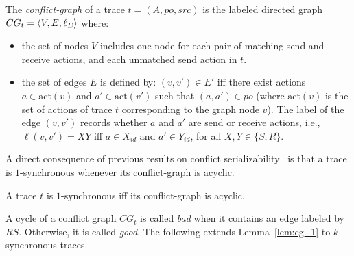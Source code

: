 
\begin{definition}\label{def:conf_graph}
    The \emph{conflict-graph} of a trace $t=(A,po,src)$ is the labeled directed graph $CG_t=\left\langle {V,E,\ell_E} \right\rangle$ where:
\begin{itemize}
	\item the set of nodes $V$ includes one node for each pair of matching send and receive actions, and each unmatched send action in $t$. 
    	\item the set of edges $E$ is defined by: $(v,v') \in E'$ iff there exist actions $a \in \mathrm{act}(v)$ and $a' \in \mathrm{act}(v')$ such that $(a,a') \in po$ (where $\mathrm{act}(v)$ is the set of actions of trace $t$ corresponding to the graph node $v$). The label of the edge $(v,v')$ records whether $a$ and $a'$ are send or receive actions, i.e., $\ell(v,v')=XY$ iff $a\in X_{id}$ and $a'\in Y_{id}$, for all $X,Y\in \{S,R\}$.
\end{itemize}
\end{definition}

A direct consequence of previous results on conflict serializability~\cite{} is that 
a trace is $1$-synchronous whenever its conflict-graph is acyclic.

\begin{lemma}\label{lem:cg_1}
A trace $t$ is $1$-synchronous if{f} its conflict-graph is acyclic.
\end{lemma}

A cycle of a conflict graph $CG_t$ is called \emph{bad} when it contains %
an edge labeled by $RS$.
Otherwise, it is called \emph{good}.
The following extends Lemma~\ref{lem:cg_1} to $k$-synchronous traces.


